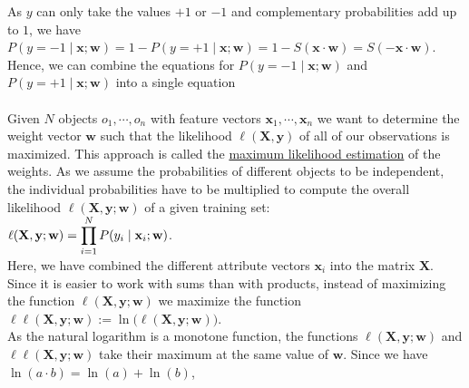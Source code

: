 As $y$ can only take the values $+1$ or $-1$ and complementary probabilities add up to $1$, we have
\\[0.2cm]
\hspace*{1.3cm}
$P(y=-1\;|\;\mathbf{x};\mathbf{w}) = 1 - P(y=+1\;|\;\mathbf{x};\mathbf{w}) 
  = 1 - S(\mathbf{x} \cdot \mathbf{w}) = S(-\mathbf{x} \cdot \mathbf{w})
$.
\\[0.2cm]
Hence, we can combine the equations for $P(y=-1\;|\;\mathbf{x};\mathbf{w})$ and $P(y=+1\;|\;\mathbf{x};\mathbf{w})$ into a
single equation
\\[0.2cm]
\hspace*{1.3cm}
\colorbox{red}{}
\\[0.2cm]
Given $N$ objects $o_1, \cdots, o_n $ with feature vectors $\mathbf{x}_1, \cdots, \mathbf{x}_n$ we
want to determine the weight vector $\mathbf{w}$ such that the likelihood $\ell(\mathbf{X}, \mathbf{y})$ of all of our
observations is maximized.  This approach is called the 
\href{https://en.wikipedia.org/wiki/Maximum_likelihood_estimation}{maximum likelihood estimation} of the weights.
As we assume the probabilities of different objects to be independent, the individual
probabilities have to be multiplied to compute the overall likelihood $\ell(\mathbf{X}, \mathbf{y};\mathbf{w})$ 
of a given training set:
\\[0.2cm]
\hspace*{1.3cm}
$\displaystyle \ell(\mathbf{X},\mathbf{y};\mathbf{w}) = \prod\limits_{i=1}^N P(y_i \;|\;\mathbf{x}_i;\mathbf{w})$.
\\[0.2cm]
Here, we have combined the different attribute vectors $\mathbf{x}_i$ into the matrix $\mathbf{X}$.  Since it is
easier to work with sums than with products, instead of maximizing the function $\ell(\mathbf{X},\mathbf{y};\mathbf{w})$ we maximize the function
\\[0.2cm]
\hspace*{1.3cm}
$\ell\ell(\mathbf{X},\mathbf{y};\mathbf{w}) := \ln\bigl(\ell(\mathbf{X},\mathbf{y};\mathbf{w})\bigr)$. 
\\[0.2cm]
As the natural logarithm is a monotone function, the functions $\ell(\mathbf{X},\mathbf{y};\mathbf{w})$ and 
$\ell\ell(\mathbf{X},\mathbf{y};\mathbf{w})$ take their maximum at the same value of $\mathbf{w}$.  Since we have
\\[0.2cm]
\hspace*{1.3cm}
$\ln(a \cdot b) = \ln(a) + \ln(b)$,
\\[0.2cm]
